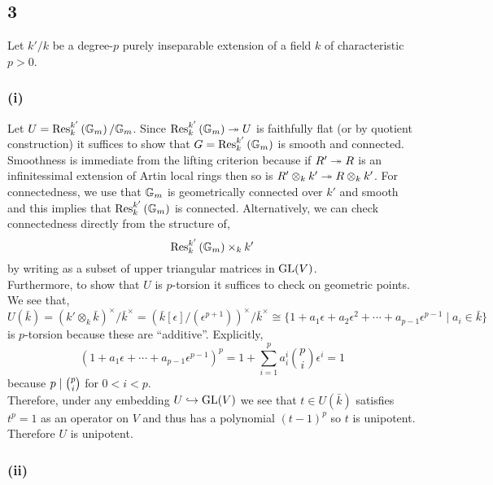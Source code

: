 \documentclass[12pt]{article}
\begin{document}
\subsection{3}

Let $k'/k$ be a degree-$p$ purely inseparable extension of a field $k$ of characteristic $p > 0$.

\subsubsection{(i)}

Let $U = \mathrm{Res}^{k'}_{k} \left( \mathbb{G}_m \right) / \mathbb{G}_m$. Since $\mathrm{Res}^{k'}_{k} \left( \mathbb{G}_m \right) \twoheadrightarrow U$ is faithfully flat (or by quotient construction) it suffices to show that $G = \mathrm{Res}^{k'}_{k} \left( \mathbb{G}_m \right)$ is smooth and connected. Smoothness is immediate from the lifting criterion because if $R' \twoheadrightarrow R$ is an infinitessimal extension of Artin local rings then so is $R' \otimes_k k' \twoheadrightarrow R \otimes_k k'$. For connectedness, we use that $\mathbb{G}_m$ is geometrically connected over $k'$ and smooth and this implies that $\mathrm{Res}^{k'}_{k} \left( \mathbb{G}_m \right)$ is connected. Alternatively, we can check connectedness directly from the structure of,
\[ \mathrm{Res}^{k'}_{k} \left( \mathbb{G}_m \right) \times_k k' \]
by writing as a subset of upper triangular matrices in $\mathrm{GL}(V)$.
\bigskip\\
Furthermore, to show that $U$ is $p$-torsion it suffices to check on geometric points. We see that,
\[ U(\bar{k}) = (k' \otimes_k \bar{k})^\times / \bar{k}^\times = (\bar{k}[\epsilon]/(\epsilon^{p+1}))^\times / \bar{k}^\times \cong \{ 1  + a_1 \epsilon + a_2 \epsilon^2 + \cdots + a_{p-1} \epsilon^{p-1} \mid a_i \in \bar{k} \} \]
is $p$-torsion because these are ``additive''. Explicitly,
\[ (1 + a_1 \epsilon + \cdots + a_{p-1} \epsilon^{p-1})^p = 1 + \sum_{i = 1}^p a_i^i {p \choose i } \epsilon^i = 1 \]
because $p \mid { p \choose i }$ for $0 < i < p$.
\bigskip\\
Therefore, under any embedding $U \hookrightarrow \mathrm{GL}(V)$ we see that $t \in U(\bar{k})$ satisfies $t^p = 1$ as an operator on $V$ and thus has a polynomial $(t - 1)^p$ so $t$ is unipotent. Therefore $U$ is unipotent.

\subsubsection{(ii)}
\end{document}
